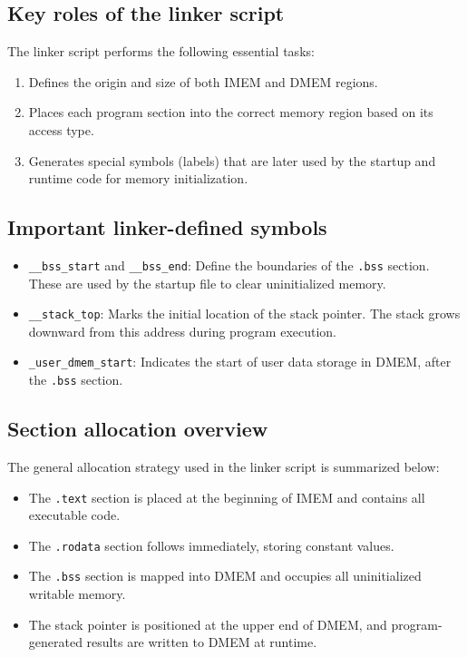 \subsection*{Key roles of the linker script}

The linker script performs the following essential tasks:
\begin{enumerate}
  \item Defines the origin and size of both IMEM and DMEM regions.
  \item Places each program section into the correct memory region based on its access type.
  \item Generates special symbols (labels) that are later used by the startup and runtime code for memory initialization.
\end{enumerate}

\subsection*{Important linker-defined symbols}

\begin{itemize}
  \item \texttt{\_\_bss\_start} and \texttt{\_\_bss\_end}: Define the boundaries of the \texttt{.bss} section.  
        These are used by the startup file to clear uninitialized memory.
  \item \texttt{\_\_stack\_top}: Marks the initial location of the stack pointer.  
        The stack grows downward from this address during program execution.
  \item \texttt{\_user\_dmem\_start}: Indicates the start of user data storage in DMEM, after the \texttt{.bss} section.
\end{itemize}

\subsection*{Section allocation overview}

The general allocation strategy used in the linker script is summarized below:
\begin{itemize}
  \item The \texttt{.text} section is placed at the beginning of IMEM and contains all executable code.
  \item The \texttt{.rodata} section follows immediately, storing constant values.
  \item The \texttt{.bss} section is mapped into DMEM and occupies all uninitialized writable memory.
  \item The stack pointer is positioned at the upper end of DMEM, and program-generated results are written to DMEM at runtime.
\end{itemize}

